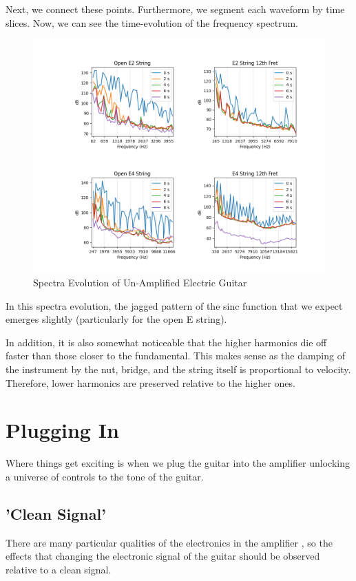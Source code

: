 \documentclass[10pt, a4paper]{article}
\begin{document}
Next, we connect these points. Furthermore, we segment each waveform by time slices. Now, we can see the time-evolution of the frequency spectrum.

\begin{figure}[H]
\centering
\caption{Spectra Evolution of Un-Amplified Electric Guitar}
\includegraphics[scale=0.5]{rhvt.png}
\end{figure}

In this spectra evolution, the jagged pattern of the sinc function that we expect emerges slightly (particularly for the open E string).

In addition, it is also somewhat noticeable that the higher harmonics die off faster than those closer to the fundamental.
This makes sense as the damping of the instrument by the nut, bridge, and the string itself is proportional to velocity.
Therefore, lower harmonics are preserved relative to the higher ones.

\section{Plugging In}

Where things get exciting is when we plug the guitar into the amplifier unlocking a universe of controls to the tone of the guitar.

\subsection{'Clean Signal'}

There are many particular qualities of the electronics in the amplifier
, so the effects that changing the electronic signal of the guitar should be observed relative to a clean signal.
\end{document}
